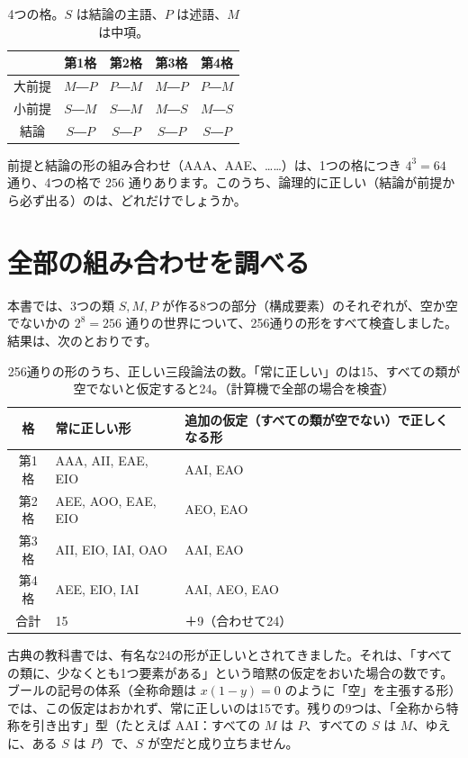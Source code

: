 \documentclass[a4paper,11pt,openany]{ltjsbook}
\begin{document}
\begin{table}[htbp]
\centering
\begin{tabular}{c|cccc}
\toprule
 & 第1格 & 第2格 & 第3格 & 第4格\\
\midrule
大前提 & $M$―$P$ & $P$―$M$ & $M$―$P$ & $P$―$M$\\
小前提 & $S$―$M$ & $S$―$M$ & $M$―$S$ & $M$―$S$\\
結論 & $S$―$P$ & $S$―$P$ & $S$―$P$ & $S$―$P$\\
\bottomrule
\end{tabular}
\caption{4つの格。$S$ は結論の主語、$P$ は述語、$M$ は中項。}
\end{table}

前提と結論の形の組み合わせ（AAA、AAE、……）は、1つの格につき $4^3=64$ 通り、4つの格で $256$ 通りあります。このうち、論理的に正しい（結論が前提から必ず出る）のは、どれだけでしょうか。

\section{全部の組み合わせを調べる}

本書では、3つの類 $S,M,P$ が作る8つの部分（構成要素）のそれぞれが、空か空でないかの $2^8=256$ 通りの世界について、256通りの形をすべて検査しました。結果は、次のとおりです。

\begin{table}[htbp]
\centering
\small
\begin{tabular}{cll}
\toprule
格 & 常に正しい形 & 追加の仮定（すべての類が空でない）で正しくなる形\\
\midrule
第1格 & AAA, AII, EAE, EIO & AAI, EAO\\
第2格 & AEE, AOO, EAE, EIO & AEO, EAO\\
第3格 & AII, EIO, IAI, OAO & AAI, EAO\\
第4格 & AEE, EIO, IAI & AAI, AEO, EAO\\
\midrule
合計 & 15 & ＋9（合わせて24）\\
\bottomrule
\end{tabular}
\caption{256通りの形のうち、正しい三段論法の数。「常に正しい」のは15、すべての類が空でないと仮定すると24。（計算機で全部の場合を検査）}
\end{table}

古典の教科書では、有名な24の形が正しいとされてきました。それは、「すべての類に、少なくとも1つ要素がある」という暗黙の仮定をおいた場合の数です。ブールの記号の体系（全称命題は $x(1-y)=0$ のように「空」を主張する形）では、この仮定はおかれず、常に正しいのは15です。残りの9つは、「全称から特称を引き出す」型（たとえば AAI：すべての $M$ は $P$、すべての $S$ は $M$、ゆえに、ある $S$ は $P$）で、$S$ が空だと成り立ちません。
\end{document}
